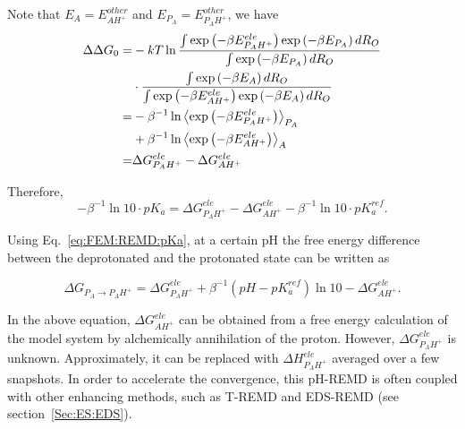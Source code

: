 Note that $E_{A}=E_{AH^{+}}^{other}$ and $E_{P_{A}}=E_{P_{A}H^{+}}^{other}$, we have
\begin{align}
	\Delta\Delta G_{0} = & -kT\ln\frac{\int\exp\left(-\beta E_{P_{A}H^{+}}^{ele}\right)\exp\left(-\beta E_{P_{A}}\right)dR_{O}}{\int\exp\left(-\beta E_{P_{A}}\right)dR_{O}}\\
	& \cdot \frac{\int\exp\left(-\beta E_{A}\right)dR_{O}}{\int\exp\left(-\beta E_{AH^{+}}^{ele}\right)\exp\left(-\beta E_{A}\right)dR_{O}}\\
	= & -\beta^{-1}\ln\left\langle \exp\left(-\beta E_{P_{A}H^{+}}^{ele}\right)\right\rangle _{P_{A}}\notag\\
	  &+\beta^{-1} \ln\left\langle \exp\left(-\beta E_{AH^{+}}^{ele}\right)\right\rangle _{A}\notag\\
	= & \Delta G_{P_{A}H^{+}}^{ele}-\Delta G_{AH^{+}}^{ele}  
\end{align}

Therefore,
\[
-\beta^{-1}\ln10\cdot pK_{a}=\Delta G_{P_{A}H^{+}}^{ele}-\Delta G_{AH^{+}}^{ele}-\beta^{-1}\ln10\cdot pK_{a}^{ref}.
\]

Using Eq.~\ref{eq:FEM:REMD:pKa}, at a certain pH the free energy difference between the deprotonated
and the protonated state can be written as

\[
\Delta G_{P_{A}\rightarrow P_{A}H^{+}}=\Delta G_{P_{A}H^{+}}^{ele}+\beta^{-1}(pH-pK_{a}^{ref})\ln10-\Delta G_{AH^{+}}^{ele}.
\]

In the above equation, $\Delta G_{AH^{+}}^{ele}$ can be obtained from a free energy calculation of the model system by alchemically annihilation of the proton. However, $\Delta G_{P_{A}H^{+}}^{ele}$ is unknown. Approximately, it can be replaced with $\Delta H_{P_{A}H^{+}}^{ele}$ averaged over a few snapshots.\cite{MengJCTC2010} In order to accelerate the convergence,
this pH-REMD is often coupled with other enhancing methods, such as T-REMD\cite{MengJCTC2010} and EDS-REMD\cite{LeeJCTC2014} (see section~\ref{Sec:ES:EDS}).